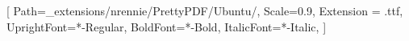 \setsansfont{Ubuntu}[
    Path=_extensions/nrennie/PrettyPDF/Ubuntu/,
    Scale=0.9,
    Extension = .ttf,
    UprightFont=*-Regular,
    BoldFont=*-Bold,
    ItalicFont=*-Italic,
    ]


